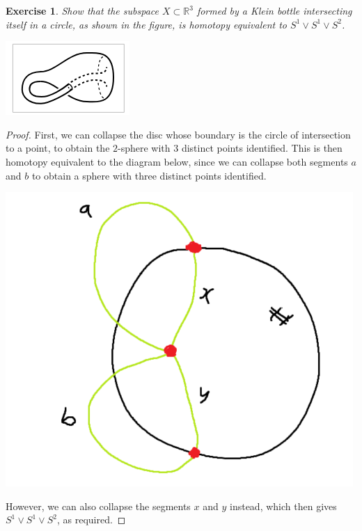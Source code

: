 \documentclass{article}
\newtheorem{exercise}[theorem]{Exercise}
\begin{document}
\begin{exercise}
Show that the subspace $X\subset\mathbb{R}^3$ formed by a Klein bottle intersecting itself in a circle, as shown in the figure, is homotopy equivalent to $S^1\vee S^1\vee S^2$.

\includegraphics[scale=0.5]{Screenshot 2025-08-06 at 01-25-18 AT.dvi - AT.pdf.png}
\end{exercise}
\begin{proof}
First, we can collapse the disc whose boundary is the circle of intersection to a point, to obtain the $2$-sphere with $3$ distinct points identified. This is then homotopy equivalent to the diagram below, since we can collapse both segments $a$ and $b$ to obtain a sphere with three distinct points identified.

\includegraphics[scale=0.5]{Screenshot (1355).png}

\noindent However, we can also collapse the segments $x$ and $y$ instead, which then gives $S^1\vee S^1\vee S^2$, as required.
\end{proof}
\end{document}
